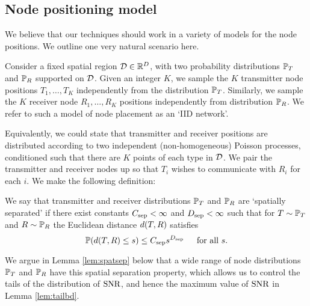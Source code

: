 \documentclass[journal]{IEEEtran}
\begin{document}
\subsection{Node positioning model}
%
We believe that our techniques should work in a variety of models for the node positions. We outline
one very natural
scenario here.
%
\begin{definition} \label{def:nodeplace}
Consider a fixed spatial region ${\mathcal{D}} \in {\mathbb {R}}^D$, with two probability distributions ${\mathbb {P}}_T$ 
and ${\mathbb {P}}_R$ supported on ${\mathcal{D}}$. Given an integer $K$, we sample the 
$K$ transmitter node positions
$T_1, \ldots, T_K$ independently from the distribution ${\mathbb {P}}_T$. Similarly, we sample
the $K$ receiver node $R_1, \ldots, R_K$ positions independently from distribution ${\mathbb {P}}_R$. We
refer to such a model of node placement as an `IID network'.
\end{definition}
%
Equivalently, we could state that transmitter and receiver positions are distributed according to two independent
(non-homogeneous) Poisson processes, conditioned such that there are $K$  points 
of each type in ${\mathcal{D}}$.
 We pair the transmitter and receiver nodes up so that $T_i$ wishes to communicate 
with $R_i$ for each $i$.
We make the following definition:
%
\begin{definition} \label{def:spatsep}
We say that transmitter and receiver distributions ${\mathbb {P}}_T$ and ${\mathbb {P}}_R$
are `spatially separated' if
there exist  constants $C_{\rm{sep}} < \infty$ and $D_{\rm{sep}} < \infty$
such that for $T \sim {\mathbb {P}}_T$ and $R \sim {\mathbb {P}}_R$ the
Euclidean distance $d(T,R)$ satisfies
\begin{equation} \label{eq:spatsep}
  {\mathbb {P}}( d( T, R) \leq s) \leq C_{\rm{sep}} s^{D_{\rm{sep}}} \mbox{ \;\;\; for all $s$}.\end{equation}
\end{definition}
%
We argue in Lemma \ref{lem:spatsep} below that a wide range of node distributions ${\mathbb {P}}_T$ and
${\mathbb {P}}_R$ have this spatial separation property, which allows us to control the tails of
the distribution of ${\rm{SNR}}$, and hence the maximum value of ${\rm{SNR}}$ 
in Lemma \ref{lem:tailbd}.
%
\end{document}

